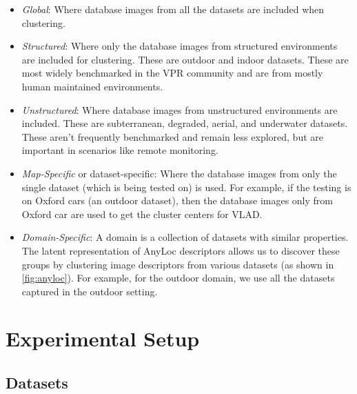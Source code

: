 \begin{itemize}
    \item \emph{Global}: Where database images from all the datasets
        are included when clustering.
    \item \emph{Structured}: Where only the database images from
        structured environments are included for clustering. These are
        outdoor and indoor datasets. These are most widely benchmarked
        in the VPR community and are from mostly human maintained
        environments.
    \item \emph{Unstructured}: Where database images from unstructured
        environments are included. These are subterranean, degraded,
        aerial, and underwater datasets. These aren't frequently
        benchmarked and remain less explored, but are important in
        scenarios like remote monitoring.
    \item \emph{Map-Specific} or dataset-specific: Where the database
        images from only the single dataset (which is being tested on)
        is used. For example, if the testing is on Oxford cars (an
        outdoor dataset), then the database images only from Oxford
        car are used to get the cluster centers for VLAD.
    \item \emph{Domain-Specific}: A domain is a collection of datasets
        with similar properties. The latent representation of AnyLoc
        descriptors allows us to discover these groups by clustering
        image descriptors from various datasets (as shown in
        \cref{fig:anyloc}). For example, for the outdoor domain, we
        use all the datasets captured in the outdoor setting.
\end{itemize}

\section{Experimental Setup}

\subsection{Datasets}

